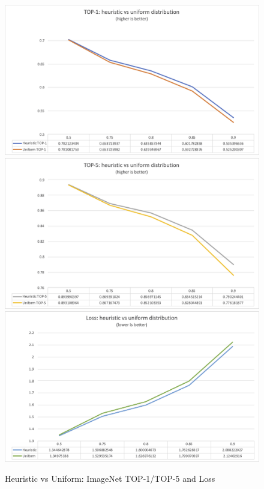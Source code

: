 \begin{figure}
    \centering
    {\includegraphics[width=.85\linewidth]{images/results/imagenet_top1.png}}
    {\includegraphics[width=.85\linewidth]{images/results/imagenet_top5.png}}
    {\includegraphics[width=.85\linewidth]{images/results/imagenet_loss.png}}
    \caption{Heuristic vs Uniform: ImageNet TOP-1/TOP-5 and Loss}\label{fig:imagenet_top1_top5_loss}
\end{figure}

